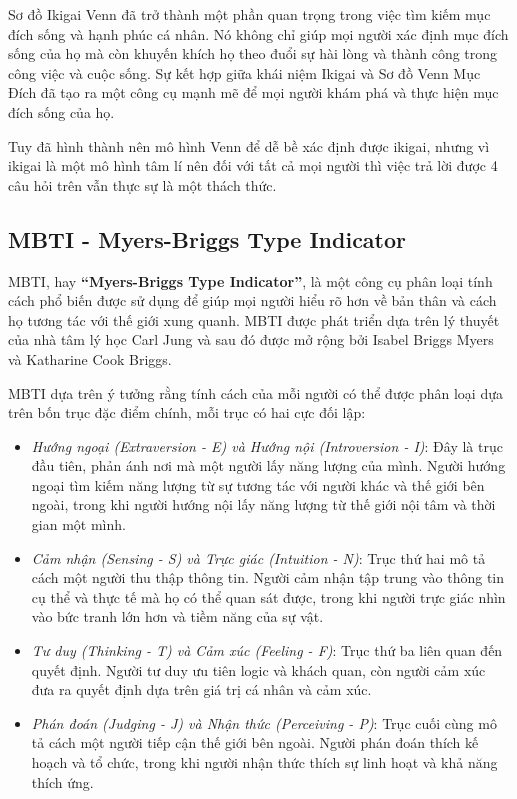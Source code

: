 Sơ đồ Ikigai Venn đã trở thành một phần quan trọng trong việc tìm kiếm mục đích sống và hạnh phúc cá nhân. Nó không chỉ giúp mọi người xác định mục đích sống của họ mà còn khuyến khích họ theo đuổi sự hài lòng và thành công trong công việc và cuộc sống. Sự kết hợp giữa khái niệm Ikigai và Sơ đồ Venn Mục Đích đã tạo ra một công cụ mạnh mẽ để mọi người khám phá và thực hiện mục đích sống của họ.

Tuy đã hình thành nên mô hình Venn để dễ bề xác định được ikigai, nhưng vì ikigai là một mô hình tâm lí nên đối với tất cả mọi người thì việc trả lời được 4 câu hỏi trên vẫn thực sự là một thách thức.

\subsection{MBTI - Myers-Briggs Type Indicator}
MBTI, hay \textbf{“Myers-Briggs Type Indicator”}, là một công cụ phân loại tính cách phổ biến được sử dụng để giúp mọi người hiểu rõ hơn về bản thân và cách họ tương tác với thế giới xung quanh. MBTI được phát triển dựa trên lý thuyết của nhà tâm lý học Carl Jung \cite{jung} và sau đó được mở rộng bởi Isabel Briggs Myers và Katharine Cook Briggs.

MBTI dựa trên ý tưởng rằng tính cách của mỗi người có thể được phân loại dựa trên bốn trục đặc điểm chính, mỗi trục có hai cực đối lập:
\begin{itemize}
    


\item \textit{Hướng ngoại (Extraversion - E) và Hướng nội (Introversion - I)}: Đây là trục đầu tiên, phản ánh nơi mà một người lấy năng lượng của mình. Người hướng ngoại tìm kiếm năng lượng từ sự tương tác với người khác và thế giới bên ngoài, trong khi người hướng nội lấy năng lượng từ thế giới nội tâm và thời gian một mình.
\item \textit{Cảm nhận (Sensing - S) và Trực giác (Intuition - N)}: Trục thứ hai mô tả cách một người thu thập thông tin. Người cảm nhận tập trung vào thông tin cụ thể và thực tế mà họ có thể quan sát được, trong khi người trực giác nhìn vào bức tranh lớn hơn và tiềm năng của sự vật.
\item \textit{Tư duy (Thinking - T) và Cảm xúc (Feeling - F)}: Trục thứ ba liên quan đến quyết định. Người tư duy ưu tiên logic và khách quan, còn người cảm xúc đưa ra quyết định dựa trên giá trị cá nhân và cảm xúc.
\item \textit{Phán đoán (Judging - J) và Nhận thức (Perceiving - P)}: Trục cuối cùng mô tả cách một người tiếp cận thế giới bên ngoài. Người phán đoán thích kế hoạch và tổ chức, trong khi người nhận thức thích sự linh hoạt và khả năng thích ứng.

\end{itemize}

